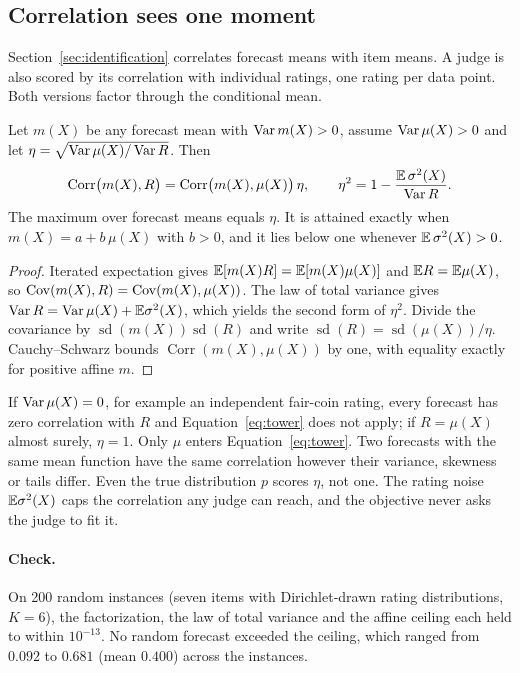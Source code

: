 \subsection{Correlation sees one moment}
\label{app:moments-tower}

Section~\ref{sec:identification} correlates forecast means with item means.
A judge is also scored by its correlation with individual ratings, one rating per data point.
Both versions factor through the conditional mean.

\begin{proposition}
\label{prop:tower}
Let $m(X)$ be any forecast mean with $\operatorname{Var} m(X)>0$, assume $\operatorname{Var}\mu(X)>0$ and let $\eta=\sqrt{\operatorname{Var}\mu(X)/\operatorname{Var} R}$.
Then
\begin{equation}
\operatorname{Corr}\bigl(m(X),R\bigr)=\operatorname{Corr}\bigl(m(X),\mu(X)\bigr)\,\eta,
\qquad
\eta^2=1-\frac{\mathbb{E}\,\sigma^2(X)}{\operatorname{Var} R}.
\label{eq:tower}
\end{equation}
The maximum over forecast means equals $\eta$.
It is attained exactly when $m(X)=a+b\,\mu(X)$ with $b>0$, and it lies below one whenever $\mathbb{E}\,\sigma^2(X)>0$.
\end{proposition}

\begin{proof}
Iterated expectation gives $\mathbb{E}[m(X)R]=\mathbb{E}[m(X)\mu(X)]$ and $\mathbb{E} R=\mathbb{E}\mu(X)$, so $\operatorname{Cov}(m(X),R)=\operatorname{Cov}(m(X),\mu(X))$.
The law of total variance gives $\operatorname{Var} R=\operatorname{Var}\mu(X)+\mathbb{E}\sigma^2(X)$, which yields the second form of $\eta^2$.
Divide the covariance by $\operatorname{sd}(m(X))\operatorname{sd}(R)$ and write $\operatorname{sd}(R)=\operatorname{sd}(\mu(X))/\eta$.
Cauchy--Schwarz bounds $\operatorname{Corr}(m(X),\mu(X))$ by one, with equality exactly for positive affine $m$.
\end{proof}

If $\operatorname{Var}\mu(X)=0$, for example an independent fair-coin rating, every forecast has zero correlation with $R$ and Equation~\eqref{eq:tower} does not apply; if $R=\mu(X)$ almost surely, $\eta=1$.
Only $\mu$ enters Equation~\eqref{eq:tower}.
Two forecasts with the same mean function have the same correlation however their variance, skewness or tails differ.
Even the true distribution $p$ scores $\eta$, not one.
The rating noise $\mathbb{E}\sigma^2(X)$ caps the correlation any judge can reach, and the objective never asks the judge to fit it.

\paragraph{Check.}
On 200 random instances (seven items with Dirichlet-drawn rating distributions, $K=6$), the factorization, the law of total variance and the affine ceiling each held to within $10^{-13}$.
No random forecast exceeded the ceiling, which ranged from $0.092$ to $0.681$ (mean $0.400$) across the instances.

